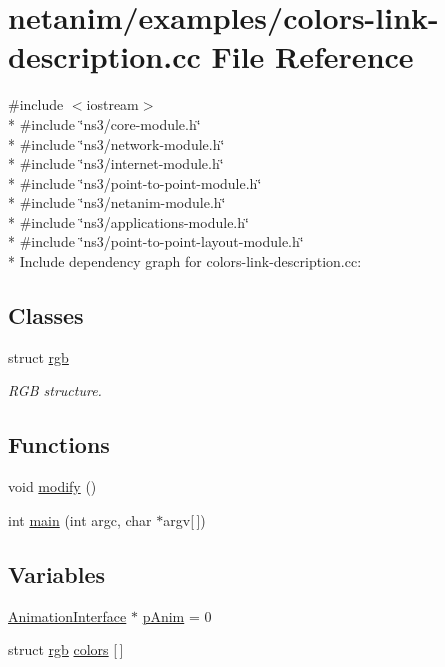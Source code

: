 \hypertarget{colors-link-description_8cc}{}\section{netanim/examples/colors-\/link-\/description.cc File Reference}
\label{colors-link-description_8cc}
{\ttfamily \#include $<$iostream$>$}\\*
{\ttfamily \#include \char`\"{}ns3/core-\/module.\+h\char`\"{}}\\*
{\ttfamily \#include \char`\"{}ns3/network-\/module.\+h\char`\"{}}\\*
{\ttfamily \#include \char`\"{}ns3/internet-\/module.\+h\char`\"{}}\\*
{\ttfamily \#include \char`\"{}ns3/point-\/to-\/point-\/module.\+h\char`\"{}}\\*
{\ttfamily \#include \char`\"{}ns3/netanim-\/module.\+h\char`\"{}}\\*
{\ttfamily \#include \char`\"{}ns3/applications-\/module.\+h\char`\"{}}\\*
{\ttfamily \#include \char`\"{}ns3/point-\/to-\/point-\/layout-\/module.\+h\char`\"{}}\\*
Include dependency graph for colors-\/link-\/description.cc\+:
\subsection*{Classes}
\begin{DoxyCompactItemize}
\item 
struct \hyperlink{structrgb}{rgb}
\begin{DoxyCompactList}\small\item\em R\+GB structure. \end{DoxyCompactList}\end{DoxyCompactItemize}
\subsection*{Functions}
\begin{DoxyCompactItemize}
\item 
void \hyperlink{colors-link-description_8cc_a7a2a3abb755d0d1a31414355520d054b}{modify} ()
\item 
int \hyperlink{colors-link-description_8cc_a0ddf1224851353fc92bfbff6f499fa97}{main} (int argc, char $\ast$argv\mbox{[}$\,$\mbox{]})
\end{DoxyCompactItemize}
\subsection*{Variables}
\begin{DoxyCompactItemize}
\item 
\hyperlink{classns3_1_1AnimationInterface}{Animation\+Interface} $\ast$ \hyperlink{colors-link-description_8cc_a4d1b1f8e5dece91ab32ba77a17ec7978}{p\+Anim} = 0
\item 
struct \hyperlink{structrgb}{rgb} \hyperlink{colors-link-description_8cc_aeede5006703c01b469f27688e8e9827d}{colors} \mbox{[}$\,$\mbox{]}
\end{DoxyCompactItemize}


